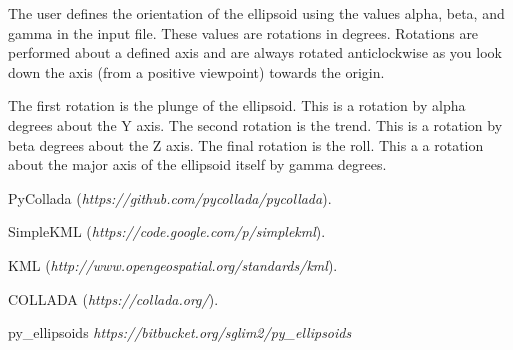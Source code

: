 \documentclass[11pt]{article}
\begin{document}
The user defines the orientation of the ellipsoid using the values alpha, beta, and gamma in the input file. These values are rotations in degrees. Rotations are performed about a defined axis and are always rotated anticlockwise as you look down the axis (from a positive viewpoint) towards the origin.

The first rotation is the plunge of the ellipsoid. This is a rotation by alpha degrees about the Y axis. The second rotation is the trend. This is a rotation by beta degrees about the Z axis. The final rotation is the roll. This a a rotation about the major axis of the ellipsoid itself by gamma degrees.


\begin{thebibliography}{1}

   PyCollada ({\em https://github.com/pycollada/pycollada}).

   SimpleKML ({\em https://code.google.com/p/simplekml}).
  
   KML ({\em http://www.opengeospatial.org/standards/kml}).
  
   COLLADA ({\em https://collada.org/}).
  
   py\_ellipsoids {\em https://bitbucket.org/sglim2/py\_ellipsoids}

\end{thebibliography}
\end{document}
